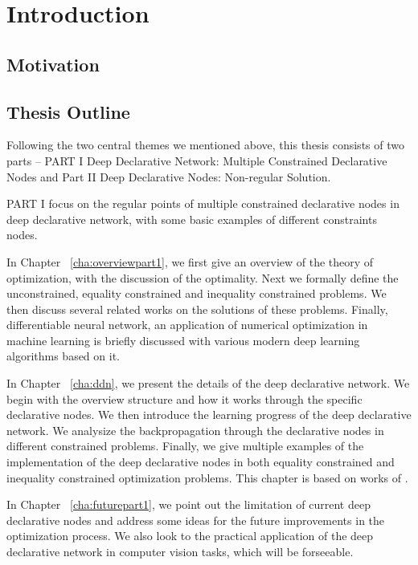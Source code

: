 \chapter{Introduction}
\label{cha:intro}

\section{Motivation}
\label{sec.motivation}




\section{Thesis Outline}
\label{sec:outline}
Following the two central themes we mentioned above, this thesis consists of two parts -- PART I Deep Declarative Network: Multiple Constrained Declarative Nodes and Part II Deep Declarative Nodes: Non-regular Solution. 
\par PART I focus on the regular points of multiple constrained declarative nodes in deep declarative network, with some basic examples of different constraints nodes. 
\begin{description}
    \item In Chapter ~\ref{cha:overviewpart1}, we first give an overview of the theory of optimization, with the discussion of the optimality. Next we formally define the unconstrained, equality constrained and inequality constrained problems. We then discuss several related works on the solutions of these problems. Finally, differentiable neural network, an application of numerical optimization in machine learning is briefly discussed with various modern deep learning algorithms based on it. 
    \item In Chapter ~\ref{cha:ddn}, we present the details of the deep declarative network. We begin with the overview structure and how it works through the specific declarative nodes. We then introduce the learning progress of the deep declarative network. We analysize the backpropagation through the declarative nodes in different constrained problems. Finally, we give multiple examples of the implementation of the deep declarative nodes in both equality constrained and inequality constrained optimization problems. This chapter is based on works of \cite{SG:19}. 
    \item In Chapter ~\ref{cha:futurepart1}, we point out the limitation of current deep declarative nodes and address some ideas for the future improvements in the optimization process. We also look to the practical application of the deep declarative network in computer vision tasks, which will be forseeable. 
\end{description}

